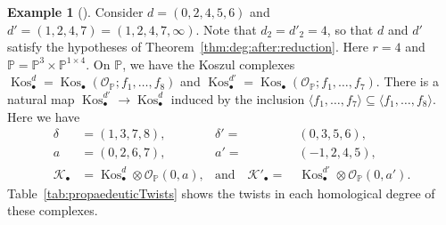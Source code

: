 \documentclass[12pt]{amsart}
\theoremstyle{definition}
\newtheorem{eg}[equation]{Example}
\newenvironment{example}[1][]{\begin{eg}[#1] \pushQED{\qed}}{\popQED \end{eg}}
\newcommand{\KK}{\mathcal{K}}
\newcommand{\cO}{{\mathcal O}}
\newcommand{\PP}{\mathbb{P}}
\DeclareMathOperator{\Kos}{Kos}
\begin{document}
\begin{example}
\label{ex:degseqs}
Consider $d=(0,2,4,5,6)$ and $d'=(1,2,4,7) = (1,2,4,7,\infty)$. 
Note that $d_2 = d'_2 = 4$, so that $d$ and $d'$ satisfy the hypotheses
of Theorem~\ref{thm:deg:after:reduction}. 
Here $r=4$ and $\PP = \PP^{3}\times \PP^{1\times 4}$. 
On $\PP$, we have the Koszul complexes 
$\Kos^d_\bullet = \Kos_\bullet(\cO_\PP; f_1, \dots, f_8)$ 
and $\Kos^{d'}_\bullet = \Kos_\bullet(\cO_\PP; f_1, \dots, f_7)$. 
There is a natural map $\Kos^{d'}_\bullet\to \Kos^{d}_\bullet$ 
induced by the inclusion 
$\langle f_1, \dots, f_7\rangle \subseteq \langle f_1, \dots, f_8\rangle$. 
Here we have  
\begin{align*}
\delta & =(1,3,7,8), & \delta'=&\ (0,3,5,6), \\
a&=(0,2,6,7),  & a'=&\ (-1,2,4,5), \\
\KK_\bullet&=\Kos^d_\bullet\otimes \cO_\PP(0,a), &\text{and}\quad 
\KK'_\bullet=&\ \Kos^{d'}_\bullet\otimes \cO_\PP(0,a').
\end{align*}
Table~\ref{tab:propaedeuticTwists} shows the twists 
in each homological degree of these complexes. 


\end{example}
\end{document}
